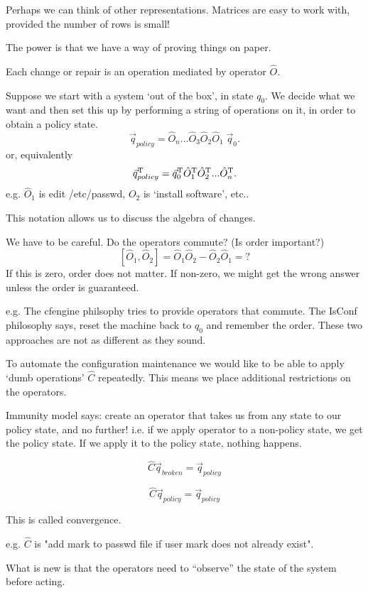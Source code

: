 \documentclass{slides}
\begin{document}
Perhaps we can think of other representations. Matrices are easy to work with,
provided the number of rows is small!

The power is that we have a way of proving things on paper.


Each change or repair is an operation mediated by operator $\hat O$.

Suppose we start with a system `out of the box', in state $q_0$. We
decide what we want and then set this up by performing a string of
operations on it, in order to obtain a policy state.
$$
\vec q_{policy} = \hat O_n ... \hat O_3\hat O_2\hat O_1\; \vec q_0.
$$
or, equivalently
$$
\vec q_{policy}^{\rm T} = \vec q_0^{\rm T} \hat O_1^{\rm T} \hat O_2^{\rm T} ...\hat O_n^{\rm T}.
$$
e.g. $\hat O_1$ is edit /etc/passwd, $O_2$ is `install software', etc..

This notation allows us to discuss the algebra of changes.


We have to be careful. Do the operators commute? (Is order important?)
$$
[\hat O_1,\hat O_2] = \hat O_1\hat O_2 - \hat O_2\hat O_1 = ?
$$
If this is zero, order does not matter. If non-zero, we might get the wrong
answer unless the order is guaranteed.

e.g. The cfengine philsophy tries to provide operators that commute. The IsConf
philosophy says, reset the machine back to $q_0$ and remember the order. These
two approaches are not as different as they sound.


To automate the configuration maintenance we would like to be able to
apply `dumb operations' $\hat C$ repeatedly. This means we place additional
restrictions on the operators. 

Immunity model says: create an operator that takes us from any state to our
policy state, and no further! i.e. if we apply operator to a non-policy state,
we get the policy state. If we apply it to the policy state, nothing happens.

$$
\hat C \vec q_{broken} = \vec q_{policy}
$$

$$
\hat C \vec q_{policy} = \vec q_{policy}
$$

This is called convergence.

e.g. $\hat C$ is "add mark to passwd file if user mark does not already exist".

What is new is that the operators need to ``observe'' the state of the system
before acting.
\end{document}
